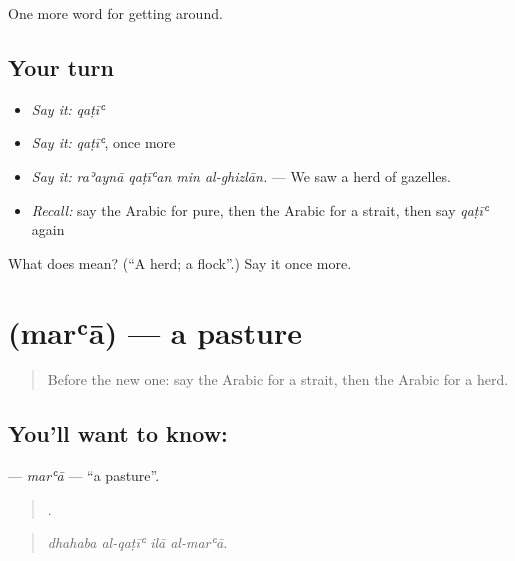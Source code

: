 \begin{grammarlens}[title={What you've built}]
One more word for getting around.
\end{grammarlens}

\subsection*{Your turn}
\begin{itemize}
\raggedright
  \item \emph{Say it:} \emph{qaṭīʿ}
  \item \emph{Say it:} \emph{qaṭīʿ}, once more
  \item \emph{Say it:} \emph{raʾaynā qaṭīʿan min al-ghizlān.} — We saw a herd of gazelles.
  \item \emph{Recall:} say the Arabic for pure, then the Arabic for a strait, then say \emph{qaṭīʿ} again
\end{itemize}

\begin{tcolorbox}[breakable,colback=teal!4,colframe=teal!35!black,title={Before you move on}]
What does  mean? (\textquotedblleft{}A herd; a flock\textquotedblright{}.) Say it once more.
\end{tcolorbox}
\section[\texorpdfstring{\ar{مرعى} (marʿā)}{مرعى (marʿā)}]{ (marʿā) — a pasture}

\label{lesson:AR-C478-mara}



\begin{quote}
Before the new one: say the Arabic for a strait, then the Arabic for a herd.
\end{quote}

\subsection*{You'll want to know: }
\textbf{} — \emph{marʿā} — \textquotedblleft{}a pasture\textquotedblright{}.

\begin{quote}
   .
\end{quote}

\begin{quote}
\emph{dhahaba al-qaṭīʿ ilā al-marʿā.}
\end{quote}

